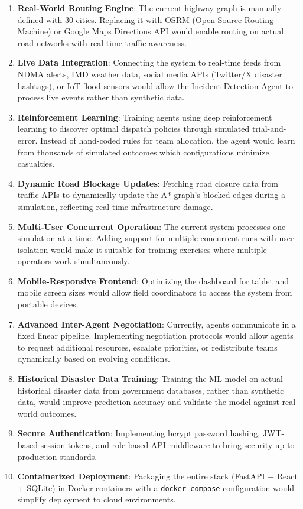 \begin{enumerate}[leftmargin=*]
    \item \textbf{Real-World Routing Engine}: The current highway graph is manually defined with 30 cities. Replacing it with OSRM (Open Source Routing Machine) or Google Maps Directions API would enable routing on actual road networks with real-time traffic awareness.

    \item \textbf{Live Data Integration}: Connecting the system to real-time feeds from NDMA alerts, IMD weather data, social media APIs (Twitter/X disaster hashtags), or IoT flood sensors would allow the Incident Detection Agent to process live events rather than synthetic data.

    \item \textbf{Reinforcement Learning}: Training agents using deep reinforcement learning to discover optimal dispatch policies through simulated trial-and-error. Instead of hand-coded rules for team allocation, the agent would learn from thousands of simulated outcomes which configurations minimize casualties.

    \item \textbf{Dynamic Road Blockage Updates}: Fetching road closure data from traffic APIs to dynamically update the A* graph's blocked edges during a simulation, reflecting real-time infrastructure damage.

    \item \textbf{Multi-User Concurrent Operation}: The current system processes one simulation at a time. Adding support for multiple concurrent runs with user isolation would make it suitable for training exercises where multiple operators work simultaneously.

    \item \textbf{Mobile-Responsive Frontend}: Optimizing the dashboard for tablet and mobile screen sizes would allow field coordinators to access the system from portable devices.

    \item \textbf{Advanced Inter-Agent Negotiation}: Currently, agents communicate in a fixed linear pipeline. Implementing negotiation protocols would allow agents to request additional resources, escalate priorities, or redistribute teams dynamically based on evolving conditions.

    \item \textbf{Historical Disaster Data Training}: Training the ML model on actual historical disaster data from government databases, rather than synthetic data, would improve prediction accuracy and validate the model against real-world outcomes.

    \item \textbf{Secure Authentication}: Implementing bcrypt password hashing, JWT-based session tokens, and role-based API middleware to bring security up to production standards.

    \item \textbf{Containerized Deployment}: Packaging the entire stack (FastAPI + React + SQLite) in Docker containers with a \texttt{docker-compose} configuration would simplify deployment to cloud environments.
\end{enumerate}

